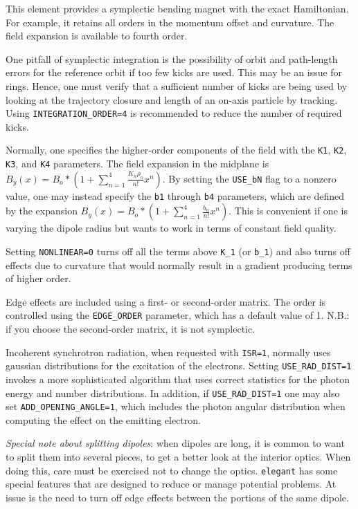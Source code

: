 This element provides a symplectic bending magnet with the exact
Hamiltonian.  For example, it retains all orders in the momentum offset
and curvature.  The field expansion is available to fourth order.

One pitfall of symplectic integration is the possibility of orbit and
path-length errors for the reference orbit if too few kicks are used.
This may be an issue for rings.  Hence, one must verify that a
sufficient number of kicks are being used by looking at the trajectory
closure and length of an on-axis particle by tracking.  Using 
{\tt INTEGRATION\_ORDER=4} is recommended to reduce the number of
required kicks.

Normally, one specifies the higher-order components of the field with
the {\tt K1}, {\tt K2}, {\tt K3}, and {\tt K4} parameters. The field
expansion in the midplane is $B_y(x) = B_o * (1 +
\sum_{n=1}^4\frac{K_n\rho_o}{n!}x^n)$.  By setting the {\tt USE\_bN}
flag to a nonzero value, one may instead specify the {\tt b1} through
{\tt b4} parameters, which are defined by the expansion $B_y(x) = B_o
* (1 + \sum_{n=1}^4\frac{b_n}{n!}x^n)$.  This is convenient if one is
varying the dipole radius but wants to work in terms of constant field
quality.  

Setting {\tt NONLINEAR=0} turns off all the terms above {\tt K\_1} (or {\tt b\_1}) and
also turns off effects due to curvature that would
normally result in a gradient producing terms of higher order.

Edge effects are included using a first- or second-order matrix.  The
order is controlled using the {\tt EDGE\_ORDER} parameter, which has a
default value of 1.  N.B.: if you choose the second-order matrix, it
is not symplectic.

Incoherent synchrotron radiation, when requested with {\tt ISR=1},
normally uses gaussian distributions for the excitation of the electrons.
Setting {\tt USE\_RAD\_DIST=1} invokes a more sophisticated algorithm that
uses correct statistics for the photon energy and number distributions.
In addition, if {\tt USE\_RAD\_DIST=1} one may also set {\tt ADD\_OPENING\_ANGLE=1},
which includes the photon angular distribution when computing the effect on 
the emitting electron.  

{\em Special note about splitting dipoles}: when dipoles are long, it is
common to want to split them into several pieces, to get a better look
at the interior optics.  When doing this, care must be exercised not
to change the optics.  {\tt elegant} has some special features that
are designed to reduce or manage potential problems. At issue is the
need to turn off edge effects between the portions of the same dipole.

